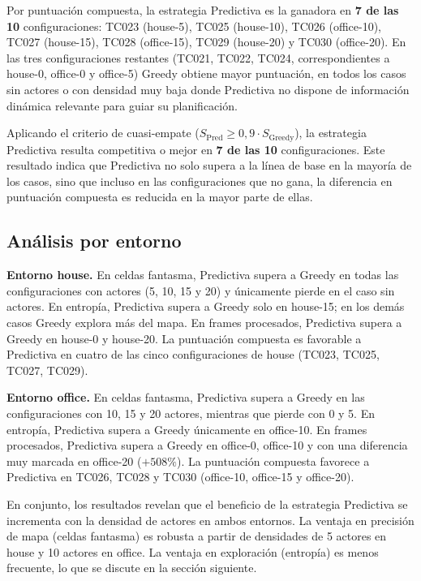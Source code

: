 Por puntuación compuesta, la estrategia Predictiva es la ganadora en \textbf{7 de las 10} configuraciones: TC023 (house-5), TC025 (house-10), TC026 (office-10), TC027 (house-15), TC028 (office-15), TC029 (house-20) y TC030 (office-20). En las tres configuraciones restantes (TC021, TC022, TC024, correspondientes a house-0, office-0 y office-5) Greedy obtiene mayor puntuación, en todos los casos sin actores o con densidad muy baja donde Predictiva no dispone de información dinámica relevante para guiar su planificación.

Aplicando el criterio de cuasi-empate ($S_{\text{Pred}} \geq 0{,}9 \cdot S_{\text{Greedy}}$), la estrategia Predictiva resulta competitiva o mejor en \textbf{7 de las 10} configuraciones. Este resultado indica que Predictiva no solo supera a la línea de base en la mayoría de los casos, sino que incluso en las configuraciones que no gana, la diferencia en puntuación compuesta es reducida en la mayor parte de ellas.

\subsection{Análisis por entorno}

\textbf{Entorno house.} En celdas fantasma, Predictiva supera a Greedy en todas las configuraciones con actores (5, 10, 15 y 20) y únicamente pierde en el caso sin actores. En entropía, Predictiva supera a Greedy solo en house-15; en los demás casos Greedy explora más del mapa. En frames procesados, Predictiva supera a Greedy en house-0 y house-20. La puntuación compuesta es favorable a Predictiva en cuatro de las cinco configuraciones de house (TC023, TC025, TC027, TC029).

\textbf{Entorno office.} En celdas fantasma, Predictiva supera a Greedy en las configuraciones con 10, 15 y 20 actores, mientras que pierde con 0 y 5. En entropía, Predictiva supera a Greedy únicamente en office-10. En frames procesados, Predictiva supera a Greedy en office-0, office-10 y con una diferencia muy marcada en office-20 ($+508\%$). La puntuación compuesta favorece a Predictiva en TC026, TC028 y TC030 (office-10, office-15 y office-20).

En conjunto, los resultados revelan que el beneficio de la estrategia Predictiva se incrementa con la densidad de actores en ambos entornos. La ventaja en precisión de mapa (celdas fantasma) es robusta a partir de densidades de 5 actores en house y 10 actores en office. La ventaja en exploración (entropía) es menos frecuente, lo que se discute en la sección siguiente.

